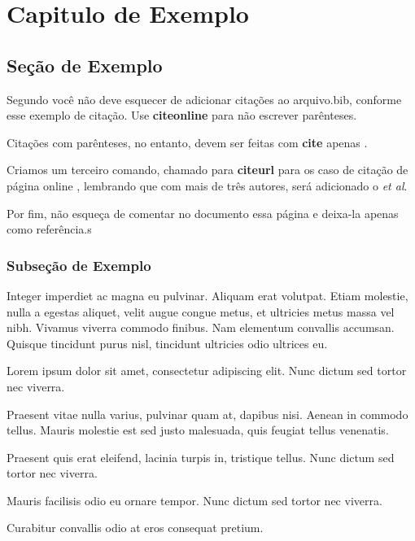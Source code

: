\chapter{Capitulo de Exemplo}
\label{cap:exemplo}

\lipsum[5]
\lipsum[6]
\lipsum[7]

\section{Seção de Exemplo}
\label{sec:exemplo}

Segundo  você não deve esquecer de adicionar citações ao arquivo.bib, conforme esse exemplo de citação. Use \textbf{citeonline} para não escrever parênteses.

Citações com parênteses, no entanto, devem ser feitas com \textbf{cite} apenas \cite{exemploartigo}.

Criamos um terceiro comando, chamado para \textbf{citeurl} para os caso de citação de página online , lembrando que com mais de três autores, será adicionado o \textit{et al}.

Por fim, não esqueça de comentar no documento essa página e deixa-la apenas como referência.s

\subsection{Subseção de Exemplo}
\label{subsec:exemplo-exemplo}

Integer imperdiet ac magna eu pulvinar. Aliquam erat volutpat. Etiam molestie, nulla a egestas aliquet, velit augue congue metus, et ultricies metus massa vel nibh. Vivamus viverra commodo finibus. Nam elementum convallis accumsan. Quisque tincidunt purus nisl, tincidunt ultricies odio ultrices eu.

\begin{alineas}
	\item Lorem ipsum dolor sit amet, consectetur adipiscing elit. Nunc dictum sed tortor nec viverra.
	\item Praesent vitae nulla varius, pulvinar quam at, dapibus nisi. Aenean in commodo tellus. Mauris molestie est sed justo malesuada, quis feugiat tellus venenatis.
	\item Praesent quis erat eleifend, lacinia turpis in, tristique tellus. Nunc dictum sed tortor nec viverra.
	\item Mauris facilisis odio eu ornare tempor. Nunc dictum sed tortor nec viverra.
	\item Curabitur convallis odio at eros consequat pretium.
\end{alineas}

